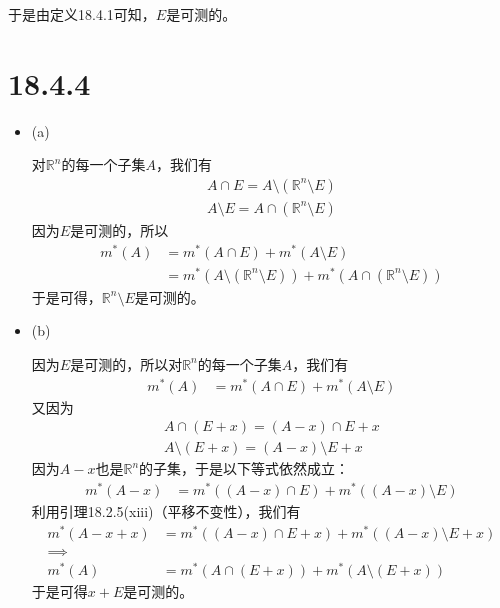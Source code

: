 \documentclass{article}
\begin{document}
于是由定义18.4.1可知，$E$是可测的。

\section*{18.4.4}

\begin{itemize}
  \item (a)

        对$\mathbb{R}^n$的每一个子集$A$，我们有
        \begin{align*}
          A \cap E = A \setminus (\mathbb{R}^n \setminus E) \\
          A \setminus E = A \cap (\mathbb{R}^n \setminus E)
        \end{align*}
        因为$E$是可测的，所以
        \begin{align*}
          m^{\ast}(A) & = m^{\ast}(A \cap E) + m^{\ast}(A \setminus E)                                                   \\
                      & = m^{\ast}(A \setminus (\mathbb{R}^n \setminus E)) + m^{\ast}(A \cap (\mathbb{R}^n \setminus E))
        \end{align*}
        于是可得，$\mathbb{R}^n \setminus E$是可测的。

  \item (b)

        因为$E$是可测的，所以对$\mathbb{R}^n$的每一个子集$A$，我们有
        \begin{align*}
          m^{\ast}(A) & = m^{\ast}(A \cap E) + m^{\ast}(A \setminus E)
        \end{align*}
        又因为
        \begin{align*}
          A \cap (E + x) = (A - x) \cap E + x \\
          A \setminus (E + x) = (A - x) \setminus E + x
        \end{align*}
        因为$A - x$也是$\mathbb{R}^n$的子集，于是以下等式依然成立：
        \begin{align*}
          m^{\ast}(A - x) & = m^{\ast}((A - x) \cap E) + m^{\ast}((A - x) \setminus E)
        \end{align*}
        利用引理18.2.5(xiii)（平移不变性），我们有
        \begin{align*}
          m^{\ast}(A - x + x) & = m^{\ast}((A - x) \cap E + x) + m^{\ast}((A - x) \setminus E + x) \\
          \implies                                                                                 \\
          m^{\ast}(A)         & = m^{\ast}(A \cap (E + x)) + m^{\ast}(A \setminus (E + x))
        \end{align*}
        于是可得$x + E$是可测的。


\end{itemize}
\end{document}
